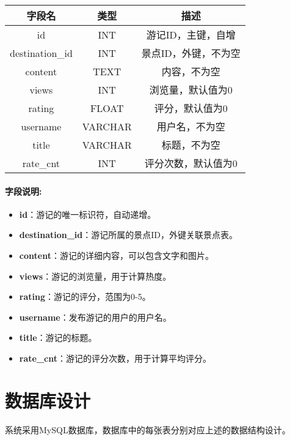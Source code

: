 \documentclass{ctexart}
\begin{document}
\begin{center}
    \begin{tabular}{ccc}
        \toprule
        字段名             & 类型      & 描述          \\
        \midrule
        id              & INT     & 游记ID，主键，自增  \\
        destination\_id & INT     & 景点ID，外键，不为空 \\
        content         & TEXT    & 内容，不为空      \\
        views           & INT     & 浏览量，默认值为0   \\
        rating          & FLOAT   & 评分，默认值为0    \\
        username        & VARCHAR & 用户名，不为空     \\
        title           & VARCHAR & 标题，不为空      \\
        rate\_cnt       & INT     & 评分次数，默认值为0  \\
        \bottomrule
    \end{tabular}
\end{center}

\paragraph{字段说明:}
\begin{itemize}
    \item \textbf{id}：游记的唯一标识符，自动递增。
    \item \textbf{destination\_id}：游记所属的景点ID，外键关联景点表。
    \item \textbf{content}：游记的详细内容，可以包含文字和图片。
    \item \textbf{views}：游记的浏览量，用于计算热度。
    \item \textbf{rating}：游记的评分，范围为0-5。
    \item \textbf{username}：发布游记的用户的用户名。
    \item \textbf{title}：游记的标题。
    \item \textbf{rate\_cnt}：游记的评分次数，用于计算平均评分。
\end{itemize}

\section{数据库设计}
系统采用MySQL数据库，数据库中的每张表分别对应上述的数据结构设计。
\end{document}
